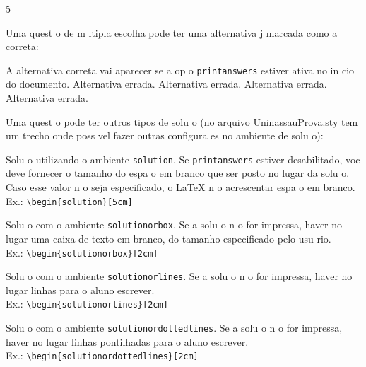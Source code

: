 \documentclass{article}
\begin{document}
\begin{questions}
\begin{multicols}{5}
\begin{enumerate}[(A)]
				\end{enumerate}
			\end{multicols}
		\question
		Uma quest o de m ltipla escolha pode ter uma alternativa j  marcada como a correta:
			\begin{choices}
				\justifying
				\CorrectChoice A alternativa correta vai aparecer se a op o \texttt{printanswers} estiver ativa no in cio do documento.
				\choice Alternativa errada.
				\choice Alternativa errada.
				\choice Alternativa errada.
				\choice Alternativa errada.
			\end{choices}
		\question
		\justifying
		Uma quest o pode ter outros tipos de solu o (no arquivo UninassauProva.sty tem um trecho onde   poss vel fazer outras configura es no ambiente de solu o):
			\begin{solution}
				\justifying Solu o utilizando o ambiente \texttt{solution}. Se \texttt{printanswers} estiver desabilitado, voc  deve fornecer o tamanho do espa o em branco que ser  posto no lugar da solu o. Caso esse valor n o seja especificado, o LaTeX n o acrescentar  espa o em branco.\\ 
                Ex.: \verb*|\begin{solution}[5cm]|
			\end{solution}
			\begin{solutionorbox}
				Solu o com o ambiente \texttt{solutionorbox}. Se a solu o n o for impressa, haver  no lugar uma caixa de texto em branco, do tamanho especificado pelo usu rio.\\ 
                Ex.: \verb*|\begin{solutionorbox}[2cm]|
			\end{solutionorbox}
			\begin{solutionorlines}
				Solu o com o ambiente \texttt{solutionorlines}. Se a solu o n o for impressa, haver  no lugar linhas para o aluno escrever.\\
                Ex.: \verb*|\begin{solutionorlines}[2cm]|
			\end{solutionorlines}
			\begin{solutionordottedlines}
				Solu o com o ambiente \texttt{solutionordottedlines}. Se a solu o n o for impressa, haver  no lugar linhas pontilhadas para o aluno escrever.\\
                Ex.: \verb*|\begin{solutionordottedlines}[2cm]|

\end{solutionordottedlines}
\end{questions}
\end{document}
